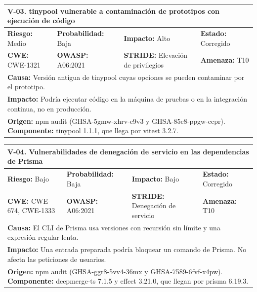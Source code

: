 \documentclass[12pt, letterpaper]{article}
\begin{document}
\vspace{8pt}

\noindent\begin{tabular}{|p{\celda}|p{\celda}|p{\celda}|p{\celda}|}
\hline
\multicolumn{4}{|p{\fila}|}{\cellcolor{gray!12}\textbf{V-03. tinypool vulnerable a contaminación de prototipos con ejecución de código}} \\
\hline
\cellcolor{orange!30}\textbf{Riesgo:} Medio & \textbf{Probabilidad:} Baja & \textbf{Impacto:} Alto & \textbf{Estado:} Corregido \\
\hline
\textbf{CWE:} CWE-1321 & \textbf{OWASP:} A06:2021 & \textbf{STRIDE:} Elevación de privilegios & \textbf{Amenaza:} T10 \\
\hline
\multicolumn{4}{|p{\fila}|}{\textbf{Causa:} Versión antigua de tinypool cuyas opciones se pueden contaminar por el prototipo.} \\
\hline
\multicolumn{4}{|p{\fila}|}{\textbf{Impacto:} Podría ejecutar código en la máquina de pruebas o en la integración continua, no en producción.} \\
\hline
\multicolumn{4}{|p{\fila}|}{\textbf{Origen:} npm audit (GHSA-5gmw-xhrv-c9v3 y GHSA-85c8-ppgw-ccpr). \textbf{Componente:} tinypool 1.1.1, que llega por vitest 3.2.7.} \\
\hline
\end{tabular}

\vspace{8pt}

\noindent\begin{tabular}{|p{\celda}|p{\celda}|p{\celda}|p{\celda}|}
\hline
\multicolumn{4}{|p{\fila}|}{\cellcolor{gray!12}\textbf{V-04. Vulnerabilidades de denegación de servicio en las dependencias de Prisma}} \\
\hline
\cellcolor{yellow!25}\textbf{Riesgo:} Bajo & \textbf{Probabilidad:} Baja & \textbf{Impacto:} Bajo & \textbf{Estado:} Corregido \\
\hline
\textbf{CWE:} CWE-674, CWE-1333 & \textbf{OWASP:} A06:2021 & \textbf{STRIDE:} Denegación de servicio & \textbf{Amenaza:} T10 \\
\hline
\multicolumn{4}{|p{\fila}|}{\textbf{Causa:} El CLI de Prisma usa versiones con recursión sin límite y una expresión regular lenta.} \\
\hline
\multicolumn{4}{|p{\fila}|}{\textbf{Impacto:} Una entrada preparada podría bloquear un comando de Prisma. No afecta las peticiones de usuarios.} \\
\hline
\multicolumn{4}{|p{\fila}|}{\textbf{Origen:} npm audit (GHSA-ggr8-5vv4-36mx y GHSA-7589-6fvf-x4pw). \textbf{Componente:} deepmerge-ts 7.1.5 y effect 3.21.0, que llegan por prisma 6.19.3.} \\
\hline
\end{tabular}
\end{document}
